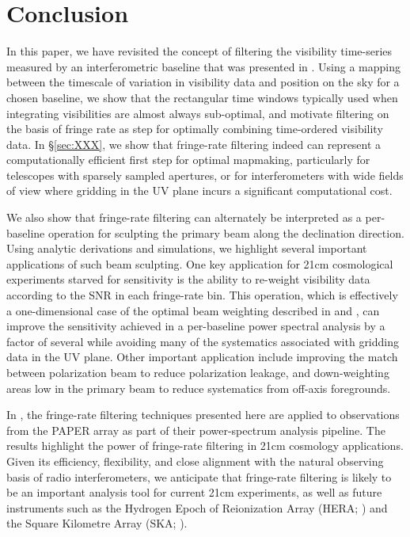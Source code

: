\documentclass[twocolumn,apj,numberedappendix]{emulateapj}
\begin{document}


\section{Conclusion}
\label{sec:conclusion}

In this paper, we have revisited the concept of filtering the visibility time-series
measured by an interferometric baseline that was presented in \citet{parsons_backer2009}.
Using a mapping between the timescale of variation in visibility data and position
on the sky for a chosen baseline, we show that the rectangular time windows typically
used when integrating visibilities are almost always sub-optimal, and motivate 
filtering on the basis of fringe rate
as step for optimally combining time-ordered visibility data.  In \S\ref{sec:XXX}, we show 
that fringe-rate filtering indeed can represent a computationally efficient first step
for optimal mapmaking, particularly for telescopes with sparsely sampled apertures, or
for interferometers with wide fields of view where gridding in the UV plane incurs a significant
computational cost.

We also show that fringe-rate filtering can alternately be interpreted as a per-baseline
operation for sculpting the primary beam along the declination direction.  Using analytic
derivations and simulations, we highlight several important applications of such beam
sculpting.  One key application for 21cm cosmological experiments starved for sensitivity
is the ability to re-weight visibility data according to the SNR in each fringe-rate bin.
This operation, which is effectively a one-dimensional case of the optimal beam
weighting described in \citet{morales_majetek2009} and \citet{bhatnagar_et_al2009}, 
can improve the sensitivity achieved in a per-baseline power spectral analysis by a factor
of several %
while avoiding many of the systematics associated with gridding data in the UV plane.
Other important application include improving the match between polarization beam to
reduce polarization leakage, and down-weighting areas low in the primary beam
to reduce systematics from off-axis foregrounds.

In \citet{ali_et_al2015}, the fringe-rate filtering techniques presented here are applied to
observations from the PAPER array as part of their power-spectrum analysis pipeline.  The
results highlight the power of fringe-rate filtering in 21cm cosmology applications.
Given its efficiency, flexibility, and close alignment with the natural observing
basis of radio interferometers, we anticipate that fringe-rate filtering is likely to be
an important analysis tool for current 21cm experiments, as well as future instruments
such as the Hydrogen Epoch of Reionization Array (HERA; \citealt{pober_et_al2014}) and
the Square Kilometre Array (SKA; \citealt{XXX}).
\end{document}
